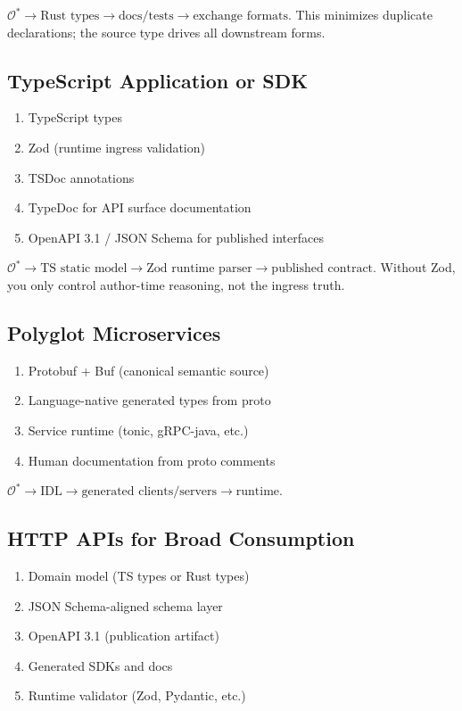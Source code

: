 \documentclass[11pt,a4paper]{article}
\theoremstyle{definition}
\begin{document}
\noindent $\mathcal{O}^* \to \text{Rust types} \to \text{docs/tests} \to \text{exchange formats}$. This minimizes duplicate declarations; the source type drives all downstream forms.

\subsection{TypeScript Application or SDK}
\begin{enumerate}
\item TypeScript types
\item Zod (runtime ingress validation)
\item TSDoc annotations
\item TypeDoc for API surface documentation
\item OpenAPI 3.1 / JSON Schema for published interfaces
\end{enumerate}

\noindent $\mathcal{O}^* \to \text{TS static model} \to \text{Zod runtime parser} \to \text{published contract}$. Without Zod, you only control author-time reasoning, not the ingress truth.

\subsection{Polyglot Microservices}
\begin{enumerate}
\item Protobuf + Buf (canonical semantic source)
\item Language-native generated types from proto
\item Service runtime (tonic, gRPC-java, etc.)
\item Human documentation from proto comments
\end{enumerate}

\noindent $\mathcal{O}^* \to \text{IDL} \to \text{generated clients/servers} \to \text{runtime}$.

\subsection{HTTP APIs for Broad Consumption}
\begin{enumerate}
\item Domain model (TS types or Rust types)
\item JSON Schema-aligned schema layer
\item OpenAPI 3.1 (publication artifact)
\item Generated SDKs and docs
\item Runtime validator (Zod, Pydantic, etc.)
\end{enumerate}
\end{document}
